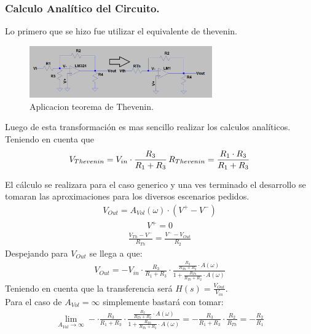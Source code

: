 \subsubsection{Calculo Analítico del Circuito.}
Lo primero que se hizo fue utilizar el equivalente de thevenin.\\

\begin{figure}[htb]	
	\centering
	\includegraphics[width=0.7\textwidth]{Ejercicio1/Imagenes/Thevenin.PNG}
	\caption{Aplicacion teorema de Thevenin.}
	\label{fig:Thevenin}
\end{figure}

Luego de esta transformación es mas sencillo realizar los calculos analíticos.
Teniendo en cuenta que 
\begin{align}V_{Thevenin} = V_{in} \cdot \frac{R_3}{R_1+R_3}  \thinspace  R_{Thevenin} = \frac{R_1\cdot R_3}{R_1+R_3}
\label{eq:thev}
\end{align} 

El cálculo se realizara para el caso generico y una ves terminado el desarrollo se tomaran las aproximaciones para los diversos escenarios pedidos.
\begin{align}
V_{Out}= A_{Vol}(\omega) \cdot (V^+ - V^-)
\end{align}
\begin{align}
V^+=0\end{align}
\begin{align}\frac{V_{Th}-V^-}{R_{Th}}=\frac{V^--V_{Out}}{R_2}
\label{eq:nodeInv}
\end{align}
Despejando para $V_{Out}$ se llega a que:
\begin{align}
\label{eq:Vout}
V_{Out}=-V_{in} \cdot \frac{R_3}{R_1+R_3} \cdot \frac{\frac{R_2}{R_{Th}+R_2}\cdot A(\omega)}{1+\frac{R_{Th}}{R_{Th}+R_2}\cdot A(\omega)}
\end{align}
Teniendo en cuenta que la transferencia será $ H(s)=\frac{V_{Out}}{V_{in}}$.\\
Para el caso de $A_{Vol}=\infty$ simplemente bastará con tomar:
\begin{align}\lim_{A_{Vol}\to\infty} - \cdot \frac{R_3}{R_1+R_3} \cdot \frac{\frac{R_2}{R_{Th}+R_2}\cdot A(\omega)}{1+\frac{R_{Th}}{R_{Th}+R_2}\cdot A(\omega)} = -\frac{R_3}{R_1+R_3}\cdot\frac{R_2}{R_{Th}}=-\frac{R_2}{R_1}\end{align}

